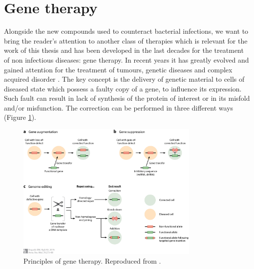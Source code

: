 \section{Gene therapy} \label{sec:gene_th}
Alongside the new compounds used to counteract bacterial infections, we want to bring the reader's attention to another class of therapies which is relevant for the work of this thesis and has been developed in the last decades for the treatment of non infectious diseases: gene therapy. In recent years it has greatly evolved and gained attention for the treatment of tumours, genetic diseases and complex acquired disorder \citep{Anguela2019}.
%
The key concept is the delivery of genetic material to cells of diseased state which possess a faulty copy of a gene, to influence its expression. Such fault can result in lack of synthesis of the protein of interest or in its misfold and/or misfunction. The correction can be performed in three different ways (Figure \ref{fig:gene_therapy}).

\begin{figure}
\begin{center}
\includegraphics[width = 0.8\textwidth]{1introduction/pics/gene_therapy.jpeg}
\caption[Principles of gene therapy]{Principles of gene therapy. Reproduced from \citet{Anguela2019}.} \label{fig:gene_therapy}
\end{center}
\end{figure}

